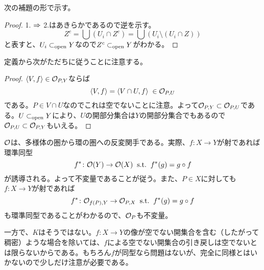 
\begin{rem}
  次の補題の形で示す。
\end{rem}
\begin{proof}
  1. $\Rightarrow$ 2.はあきらかであるので逆を示す。
  \[
  Z^c = \bigcup (U_i \cap Z^c) = \bigcup (U_i \setminus (U_i \cap Z))
  \]
  と表すと、$U_i \subset_{\text{open}} Y$なので$Z^c \subset_{\text{open}} Y$がわかる。
\end{proof}



\begin{rem}
  定義から次がただちに従うことに注意する。
\end{rem}
\begin{proof}
  $\langle V,f \rangle \in \mathcal{O}_{P,Y}$ならば
  \[
  \langle V,f \rangle = \langle V \cap U,f \rangle \; \in \mathcal{O}_{P,U}
  \]
  である。$P \in V \cap U$なのでこれは空でないことに注意。よって$\mathcal{O}_{P,Y} \subset \mathcal{O}_{P,U}$である。$U \subset_{\text{open}} Y$により、$U$の開部分集合は$Y$の開部分集合でもあるので$\mathcal{O}_{P,U} \subset \mathcal{O}_{P,Y}$もいえる。
\end{proof}



\begin{rem}
  $\mathcal{O}$は、多様体の圏から環の圏への反変関手である。実際、$f \colon X \to Y$が射であれば環準同型
  \[
  f^* \colon \mathcal{O} (Y) \to \mathcal{O}(X)  \; \; \text{s.t.} \; \; f^*(g) = g \circ f
  \]
  が誘導される。よって不変量であることが従う。また、$P \in X$に対しても$f \colon X \to Y$が射であれば
  \[
  f^* \colon \mathcal{O}_{f(P),Y} \to \mathcal{O}_{P,X} \; \; \text{s.t.} \; \;  f^*(g) = g \circ f
  \]
  も環準同型であることがわかるので、$\mathcal{O}_P$も不変量。

  一方で、$K$はそうではない。$f \colon X \to Y$の像が空でない開集合を含む（したがって稠密）ような場合を除いては、$f$による空でない開集合の引き戻しは空でないとは限らないからである。もちろん$f$が同型なら問題はないが、完全に同様とはいかないので少しだけ注意が必要である。
\end{rem}



